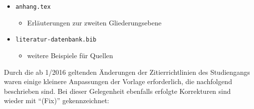 \begin{itemize}
\item \verb|anhang.tex|
\begin{itemize}
\item Erläuterungen zur zweiten Gliederungsebene
\end{itemize}

\item \verb|literatur-datenbank.bib|
\begin{itemize}
\item weitere Beispiele für Quellen
\end{itemize}

\end{itemize}

\label{anhang:ReleaseNotes13}
Durch die ab 1/2016 geltenden Änderungen der Zitierrichtlinien des Studiengangs waren einige kleinere Anpassungen der Vorlage erforderlich, die nachfolgend beschrieben sind. Bei dieser Gelegenheit ebenfalls erfolgte Korrekturen sind wieder mit \enquote{(Fix)} gekennzeichnet:

